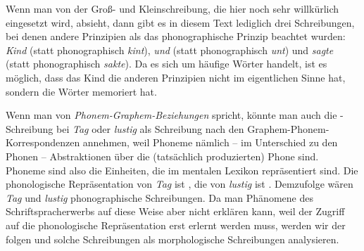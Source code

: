 Wenn man von der Groß- und Kleinschreibung, die hier noch sehr willkürlich eingesetzt wird, absieht, dann gibt es in diesem Text lediglich drei Schreibungen, bei denen andere Prinzipien als das phonographische Prinzip beachtet wurden: \textit{Kind} (statt phonographisch \textit{kint}), \textit{und} (statt phonographisch \textit{unt}) und \textit{sagte} (statt phonographisch \textit{sakte}). Da es sich um häufige Wörter handelt, ist es möglich, dass das Kind die anderen Prinzipien nicht im eigentlichen Sinne  hat, sondern die Wörter memoriert hat.

Wenn man von \textit{Phonem-Graphem-Beziehungen} spricht, könnte man auch die -Schreibung bei \textit{Tag} oder \textit{lustig} als Schreibung nach den Graphem-Phonem-Korrespondenzen annehmen, weil Phoneme nämlich -- im Unterschied zu den Phonen -- Abstraktionen über die (tatsächlich produzierten) Phone sind. Phoneme sind also die Einheiten, die im mentalen Lexikon repräsentiert sind. Die phonologische Repräsentation von \textit{Tag} ist , die von \textit{lustig} ist . Demzufolge wären \textit{Tag} und \textit{lustig} phonographische Schreibungen. Da man Phänomene des Schriftspracherwerbs auf diese Weise aber nicht erklären kann, weil der Zugriff auf die phonologische Repräsentation erst erlernt werden muss, werden wir der \citet[913f]{Duden2022} folgen und solche Schreibungen als morphologische Schreibungen analysieren.



